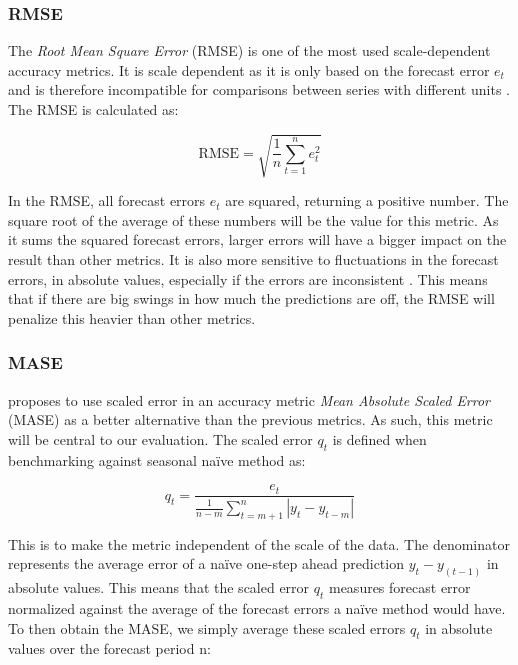 \documentclass[12pt,a4paper]{article}
\begin{document}
\subsubsection{RMSE}

The \textit{Root Mean Square Error} (RMSE) is one of the most used scale-dependent accuracy metrics. It is scale dependent as it is only based on the forecast error $e_t$ and is therefore incompatible for comparisons between series with different units \parencite{HyndmanForecasting2021}. The RMSE is calculated as: 

\begin{equation}
  \text{RMSE} = \sqrt{\frac{1}{n} \sum_{t=1}^{n} e_t^2}
\end{equation}

In the RMSE, all forecast errors $e_t$ are squared, returning a positive number. The square root of the average of these numbers will be the value for this metric. As it sums the squared forecast errors, larger errors will have a bigger impact on the result than other metrics. It is also more sensitive to fluctuations in the forecast errors, in absolute values, especially if the errors are inconsistent \parencite{Willmott2005}. This means that if there are big swings in how much the predictions are off, the RMSE will penalize this heavier than other metrics. 

\subsubsection{MASE}

\cite{HyndmanAccuracy2006} proposes to use scaled error in an accuracy metric \textit{Mean Absolute Scaled Error} (MASE) as a better alternative than the previous metrics. As such, this metric will be central to our evaluation. The scaled error $q_t$ is defined when benchmarking against seasonal naïve method as: 

\begin{equation}
  q_t = \frac{e_t}{\frac{1}{n-m} \sum_{t=m+1}^{n} \left| y_t - y_{t-m} \right|}
\end{equation}

This is to make the metric independent of the scale of the data. The denominator represents the average error of a naïve one-step ahead prediction $y_t-y_{\left(t-1\right)}$ in absolute values. This means that the scaled error $q_t$ measures forecast error normalized against the average of the forecast errors a naïve method would have. To then obtain the MASE, we simply average these scaled errors $q_t$ in absolute values over the forecast period n:
\end{document}
